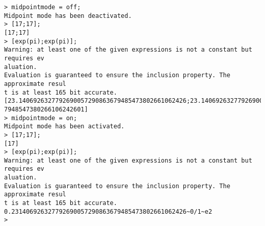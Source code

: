 \begin{center}\begin{minipage}{15cm}\begin{Verbatim}[frame=single]
> midpointmode = off;
Midpoint mode has been deactivated.
> [17;17];
[17;17]
> [exp(pi);exp(pi)];
Warning: at least one of the given expressions is not a constant but requires ev
aluation.
Evaluation is guaranteed to ensure the inclusion property. The approximate resul
t is at least 165 bit accurate.
[23.1406926327792690057290863679485473802661062426;23.14069263277926900572908636
7948547380266106242601]
> midpointmode = on;
Midpoint mode has been activated.
> [17;17];
[17]
> [exp(pi);exp(pi)];
Warning: at least one of the given expressions is not a constant but requires ev
aluation.
Evaluation is guaranteed to ensure the inclusion property. The approximate resul
t is at least 165 bit accurate.
0.231406926327792690057290863679485473802661062426~0/1~e2
> 
\end{Verbatim}
\end{minipage}\end{center}
